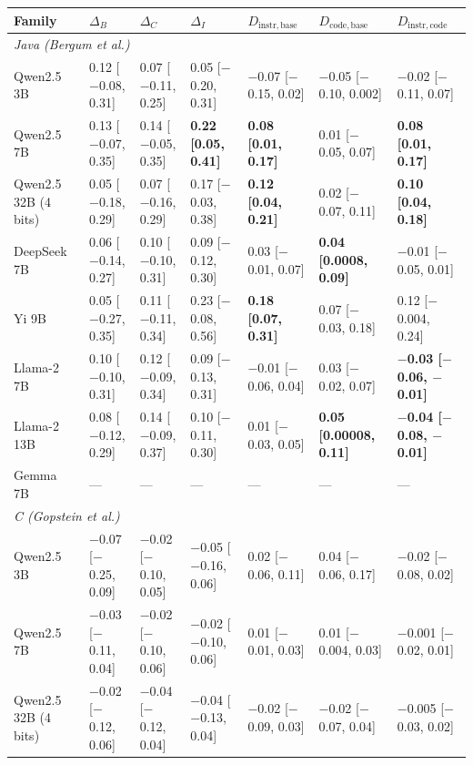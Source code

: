 \begin{tabular}{lllllll}
\toprule
Family & $\Delta_B$ & $\Delta_C$ & $\Delta_I$ & $D_{\mathrm{instr},\mathrm{base}}$ & $D_{\mathrm{code},\mathrm{base}}$ & $D_{\mathrm{instr},\mathrm{code}}$ \\
\midrule
\multicolumn{7}{l}{\textit{Java (Bergum et al.)}} \\
Qwen2.5 3B & 0.12 [$-$0.08, 0.31] & 0.07 [$-$0.11, 0.25] & 0.05 [$-$0.20, 0.31] & $-$0.07 [$-$0.15, 0.02] & $-$0.05 [$-$0.10, 0.002] & $-$0.02 [$-$0.11, 0.07] \\
Qwen2.5 7B & 0.13 [$-$0.07, 0.35] & 0.14 [$-$0.05, 0.35] & \textbf{0.22 [0.05, 0.41]} & \textbf{0.08 [0.01, 0.17]} & 0.01 [$-$0.05, 0.07] & \textbf{0.08 [0.01, 0.17]} \\
Qwen2.5 32B (4 bits) & 0.05 [$-$0.18, 0.29] & 0.07 [$-$0.16, 0.29] & 0.17 [$-$0.03, 0.38] & \textbf{0.12 [0.04, 0.21]} & 0.02 [$-$0.07, 0.11] & \textbf{0.10 [0.04, 0.18]} \\
DeepSeek 7B & 0.06 [$-$0.14, 0.27] & 0.10 [$-$0.10, 0.31] & 0.09 [$-$0.12, 0.30] & 0.03 [$-$0.01, 0.07] & \textbf{0.04 [0.0008, 0.09]} & $-$0.01 [$-$0.05, 0.01] \\
Yi 9B & 0.05 [$-$0.27, 0.35] & 0.11 [$-$0.11, 0.34] & 0.23 [$-$0.08, 0.56] & \textbf{0.18 [0.07, 0.31]} & 0.07 [$-$0.03, 0.18] & 0.12 [$-$0.004, 0.24] \\
Llama-2 7B & 0.10 [$-$0.10, 0.31] & 0.12 [$-$0.09, 0.34] & 0.09 [$-$0.13, 0.31] & $-$0.01 [$-$0.06, 0.04] & 0.03 [$-$0.02, 0.07] & \textbf{$-$0.03 [$-$0.06, $-$0.01]} \\
Llama-2 13B & 0.08 [$-$0.12, 0.29] & 0.14 [$-$0.09, 0.37] & 0.10 [$-$0.11, 0.30] & 0.01 [$-$0.03, 0.05] & \textbf{0.05 [0.00008, 0.11]} & \textbf{$-$0.04 [$-$0.08, $-$0.01]} \\
Gemma 7B & --- & --- & --- & --- & --- & --- \\
\multicolumn{7}{l}{\textit{C (Gopstein et al.)}} \\
Qwen2.5 3B & $-$0.07 [$-$0.25, 0.09] & $-$0.02 [$-$0.10, 0.05] & $-$0.05 [$-$0.16, 0.06] & 0.02 [$-$0.06, 0.11] & 0.04 [$-$0.06, 0.17] & $-$0.02 [$-$0.08, 0.02] \\
Qwen2.5 7B & $-$0.03 [$-$0.11, 0.04] & $-$0.02 [$-$0.10, 0.06] & $-$0.02 [$-$0.10, 0.06] & 0.01 [$-$0.01, 0.03] & 0.01 [$-$0.004, 0.03] & $-$0.001 [$-$0.02, 0.01] \\
Qwen2.5 32B (4 bits) & $-$0.02 [$-$0.12, 0.06] & $-$0.04 [$-$0.12, 0.04] & $-$0.04 [$-$0.13, 0.04] & $-$0.02 [$-$0.09, 0.03] & $-$0.02 [$-$0.07, 0.04] & $-$0.005 [$-$0.03, 0.02] \\

\end{tabular}
